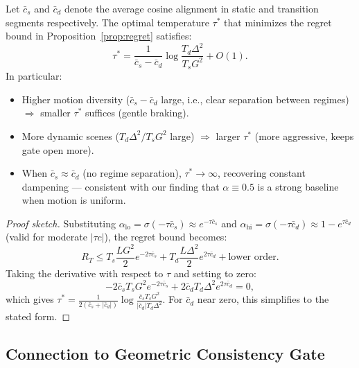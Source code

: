 \begin{proposition}
\label{prop:tau}
Let $\bar{c}_s$ and $\bar{c}_d$ denote the average cosine alignment in static and transition segments respectively. The optimal temperature $\tau^*$ that minimizes the regret bound in Proposition~\ref{prop:regret} satisfies:
\begin{equation}
    \tau^* = \frac{1}{\bar{c}_s - \bar{c}_d} \log\frac{T_d \Delta^2}{T_s G^2} + O(1).
\end{equation}
In particular:
\begin{itemize}
    \item Higher motion diversity ($\bar{c}_s - \bar{c}_d$ large, i.e., clear separation between regimes) $\Rightarrow$ smaller $\tau^*$ suffices (gentle braking).
    \item More dynamic scenes ($T_d \Delta^2 / T_s G^2$ large) $\Rightarrow$ larger $\tau^*$ (more aggressive, keeps gate open more).
    \item When $\bar{c}_s \approx \bar{c}_d$ (no regime separation), $\tau^* \to \infty$, recovering constant dampening — consistent with our finding that $\alpha \equiv 0.5$ is a strong baseline when motion is uniform.
\end{itemize}
\end{proposition}

\begin{proof}[Proof sketch]
Substituting $\alpha_{\text{lo}} = \sigma(-\tau \bar{c}_s) \approx e^{-\tau \bar{c}_s}$ and $\alpha_{\text{hi}} = \sigma(-\tau \bar{c}_d) \approx 1 - e^{\tau \bar{c}_d}$ (valid for moderate $|\tau c|$), the regret bound becomes:
\begin{equation}
    R_T \leq T_s \frac{L G^2}{2} e^{-2\tau \bar{c}_s} + T_d \frac{L \Delta^2}{2} e^{2\tau \bar{c}_d} + \text{lower order}.
\end{equation}
Taking the derivative with respect to $\tau$ and setting to zero:
\begin{equation}
    -2\bar{c}_s T_s G^2 e^{-2\tau \bar{c}_s} + 2\bar{c}_d T_d \Delta^2 e^{2\tau \bar{c}_d} = 0,
\end{equation}
which gives $\tau^* = \frac{1}{2(\bar{c}_s + |\bar{c}_d|)} \log \frac{\bar{c}_s T_s G^2}{|\bar{c}_d| T_d \Delta^2}$. For $\bar{c}_d$ near zero, this simplifies to the stated form.
\end{proof}

\subsection{Connection to Geometric Consistency Gate}

